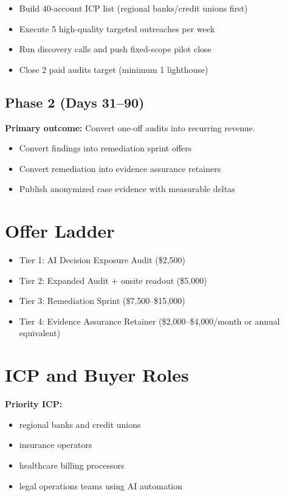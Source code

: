 \documentclass[11pt]{article}
\begin{document}
\begin{itemize}
  \item Build 40-account ICP list (regional banks/credit unions first)
  \item Execute 5 high-quality targeted outreaches per week
  \item Run discovery calls and push fixed-scope pilot close
  \item Close 2 paid audits target (minimum 1 lighthouse)
\end{itemize}

\subsection*{Phase 2 (Days 31--90)}
\textbf{Primary outcome:} Convert one-off audits into recurring revenue.

\begin{itemize}
  \item Convert findings into remediation sprint offers
  \item Convert remediation into evidence assurance retainers
  \item Publish anonymized case evidence with measurable deltas
\end{itemize}

\section*{Offer Ladder}
\begin{itemize}
  \item Tier 1: AI Decision Exposure Audit (\$2{,}500)
  \item Tier 2: Expanded Audit + onsite readout (\$5{,}000)
  \item Tier 3: Remediation Sprint (\$7{,}500--\$15{,}000)
  \item Tier 4: Evidence Assurance Retainer (\$2{,}000--\$4{,}000/month or annual equivalent)
\end{itemize}

\section*{ICP and Buyer Roles}
\textbf{Priority ICP:}
\begin{itemize}
  \item regional banks and credit unions
  \item insurance operators
  \item healthcare billing processors
  \item legal operations teams using AI automation
\end{itemize}
\end{document}
